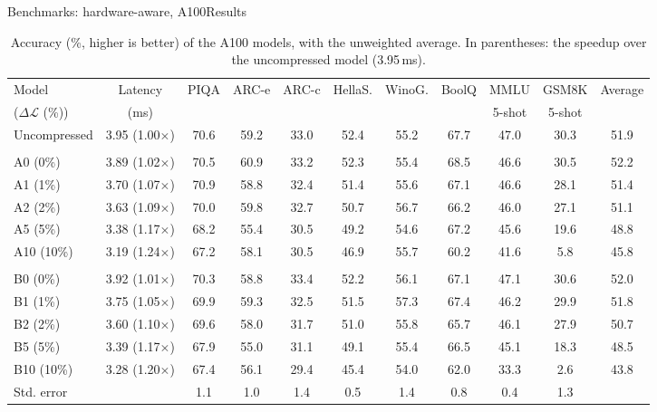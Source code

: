 \documentclass[aspectratio=169,10pt]{beamer}
\newcommand{\dloss}{\Delta\mathcal{L}}
\begin{document}
\begin{frame}{Benchmarks: hardware-aware, A100}{Results}
\begin{table}
\centering
\begin{adjustbox}{width=\linewidth, totalheight=0.64\textheight, keepaspectratio, center}
\centering
\small
\setlength{\tabcolsep}{3pt}
\begin{tabular}{lcccccccccc}
\toprule
Model & Latency & PIQA & ARC-e & ARC-c & HellaS. & WinoG. & BoolQ & MMLU & GSM8K & Average \\
($\dloss$ (\%)) & (ms)   &      &       &       &         &        &       & 5-shot & 5-shot & \\
\midrule
Uncompressed & 3.95 (1.00$\times$) & 70.6 & 59.2 & 33.0 & 52.4 & 55.2 & 67.7 & 47.0 & 30.3 & 51.9 \\
\addlinespace
\multicolumn{11}{l}{\emph{2 objectives}} \\
A0  (0\%)  & 3.89 (1.02$\times$) & 70.5 & 60.9 & 33.2 & 52.3 & 55.4 & 68.5 & 46.6 & 30.5 & 52.2 \\
A1  (1\%)  & 3.70 (1.07$\times$) & 70.9 & 58.8 & 32.4 & 51.4 & 55.6 & 67.1 & 46.6 & 28.1 & 51.4 \\
A2  (2\%)  & 3.63 (1.09$\times$) & 70.0 & 59.8 & 32.7 & 50.7 & 56.7 & 66.2 & 46.0 & 27.1 & 51.1 \\
A5  (5\%)  & 3.38 (1.17$\times$) & 68.2 & 55.4 & 30.5 & 49.2 & 54.6 & 67.2 & 45.6 & 19.6 & 48.8 \\
A10 (10\%) & 3.19 (1.24$\times$) & 67.2 & 58.1 & 30.5 & 46.9 & 55.7 & 60.2 & 41.6 &  5.8 & 45.8 \\
\addlinespace
\multicolumn{11}{l}{\emph{3 objectives}} \\
B0  (0\%)  & 3.92 (1.01$\times$) & 70.3 & 58.8 & 33.4 & 52.2 & 56.1 & 67.1 & 47.1 & 30.6 & 52.0 \\
B1  (1\%)  & 3.75 (1.05$\times$) & 69.9 & 59.3 & 32.5 & 51.5 & 57.3 & 67.4 & 46.2 & 29.9 & 51.8 \\
B2  (2\%)  & 3.60 (1.10$\times$) & 69.6 & 58.0 & 31.7 & 51.0 & 55.8 & 65.7 & 46.1 & 27.9 & 50.7 \\
B5  (5\%)  & 3.39 (1.17$\times$) & 67.9 & 55.0 & 31.1 & 49.1 & 55.4 & 66.5 & 45.1 & 18.3 & 48.5 \\
B10 (10\%) & 3.28 (1.20$\times$) & 67.4 & 56.1 & 29.4 & 45.4 & 54.0 & 62.0 & 33.3 &  2.6 & 43.8 \\
\midrule
Std. error &      & 1.1  & 1.0  & 1.4  & 0.5  & 1.4  & 0.8  & 0.4  & 1.3  & \\
\bottomrule
\end{tabular}
\end{adjustbox}
\caption{Accuracy (\%, higher is better) of the A100 models, with the unweighted average. In parentheses: the speedup over the uncompressed model (3.95\,ms).}\label{tab:a100results}
\end{table}
\end{frame}
\end{document}
